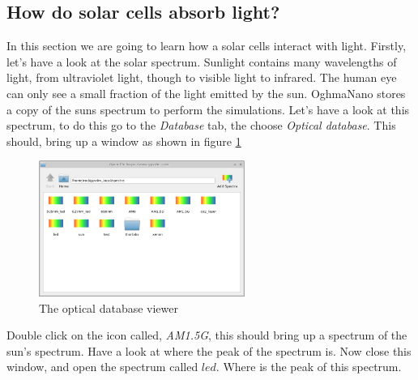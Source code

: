 \newpage
\subsection{How do solar cells absorb light?}
In this section we are going to learn how a solar cells interact with light.  Firstly, let's have a look at the solar spectrum.  Sunlight contains many wavelengths of light, from ultraviolet light, though to visible light to infrared.  The human eye can only see a small fraction of the light emitted by the sun.  OghmaNano stores a copy of the suns spectrum to perform the simulations.  Let's have a look at this spectrum, to do this go to the \emph{Database} tab, the choose \emph{Optical database}.  This should, bring up a window as shown in figure \ref{fig:optical_database}

\begin{figure}[h!]
\centering
\includegraphics[width=0.6\textwidth]{./images/running/optical_database.png}
\caption{The optical database viewer}
\label{fig:optical_database}
\end{figure}

Double click on the icon called, \emph{AM1.5G}, this should bring up a spectrum of the sun's spectrum.  Have a look at where the peak of the spectrum is.  Now close this window, and open the spectrum called $led$.  Where is the peak of this spectrum.


